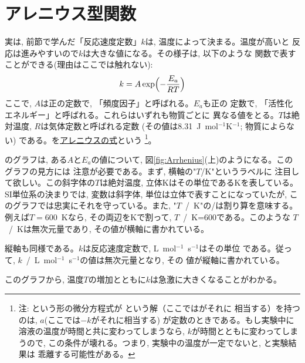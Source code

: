 \section{アレニウス型関数}

実は, 前節で学んだ「反応速度定数」$k$は, 温度によって決まる。温度が高いと
反応は進みやすいので$k$は大きな値になる。その様子は, 以下のような
関数で表すことができる(理由はここでは触れない):
\begin{eqnarray}
k=A\exp\Bigl(-\frac{E_a}{RT}\Bigr)\label{eq:k_Arrhenius}
\end{eqnarray}
ここで, $A$は正の定数で, 「頻度因子」と呼ばれる。$E_a$も正の
定数で, 「活性化エネルギー」と呼ばれる。これらはいずれも物質ごとに
異なる値をとる。$T$は絶対温度, $R$は気体定数と呼ばれる定数
(その値は8.31~J~mol$^{-1}$K$^{-1}$; 物質によらない)
である。を\underline{アレニウスの式}という
\footnote{\small 注: という形の微分方程式が
という解（ここではがそれに
相当する）を持つのは, $a$(ここでは$-k$がそれに相当する)
が定数のときである。もし実験中に溶液の温度が時間と共に変わってしまうなら, 
$k$が時間とともに変わってしまうので, この条件が壊れる。つまり, 
実験中の温度が一定でないと, と実験結果は
乖離する可能性がある。}。

のグラフは, ある$A$と$E_a$の値について, 
図\ref{fig:Arrhenius}(上)のようになる。このグラフの見方には
注意が必要である。まず, 横軸の"$T$/K"というラベルに
注目して欲しい。この斜字体の$T$は絶対温度, 立体Kはその単位であるKを表している。
SI単位系の決まりでは, 変数は斜字体, 単位は立体で表すことになっていたが, 
このグラフでは忠実にそれを守っている。また, "$T$~/~K"の/は割り算を意味する。
例えば$T=600$~Kなら, その両辺をKで割って, $T$~/~K=600である。このような
$T$~/~Kは無次元量であり, その値が横軸に書かれている。

縦軸も同様である。$k$は反応速度定数で, L~mol$^{-1}$~s$^{-1}$はその単位
である。従って, $k$~/~L~mol$^{-1}$~s$^{-1}$の値は無次元量となり, その
値が縦軸に書かれている。

このグラフから, 温度$T$の増加とともに$k$は急激に大きくなることがわかる。\\

